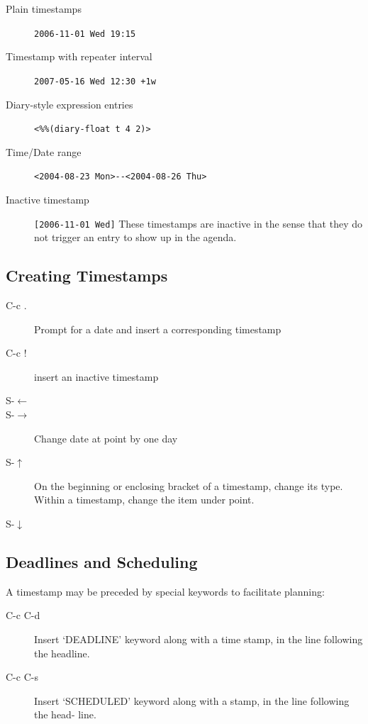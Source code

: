 \begin{description}
\item[Plain timestamps] \verb|2006-11-01 Wed 19:15|
\item[Timestamp with repeater interval] \verb|2007-05-16 Wed 12:30 +1w|
\item[Diary-style expression entries] \verb|<%%(diary-float t 4 2)>|
\item[Time/Date range] \verb|<2004-08-23 Mon>--<2004-08-26 Thu>|
\item[Inactive timestamp] \verb|[2006-11-01 Wed]| These timestamps are inactive in the sense that they do not trigger an entry to show up in the agenda.
\end{description}

\subsection{Creating Timestamps}
\begin{description}
\item [C-c .] Prompt for a date and insert a corresponding timestamp 
\item[C-c !] insert an inactive timestamp 
\item[S-$\leftarrow$]
\item[S-$\rightarrow$] Change date at point by one day 
\item[S-$\uparrow$] On the beginning or enclosing bracket of a timestamp, change its type. Within a timestamp, change the item under point. 
\item[S-$\downarrow$]
\end{description}

\subsection{Deadlines and Scheduling}
A timestamp may be preceded by special keywords to facilitate planning:

\begin{description}
\item[C-c C-d] Insert ‘DEADLINE’ keyword along with a time stamp, in the line following the headline. 
\item[C-c C-s] Insert ‘SCHEDULED’ keyword along with a stamp, in the line following the head- line. 
\end{description}



